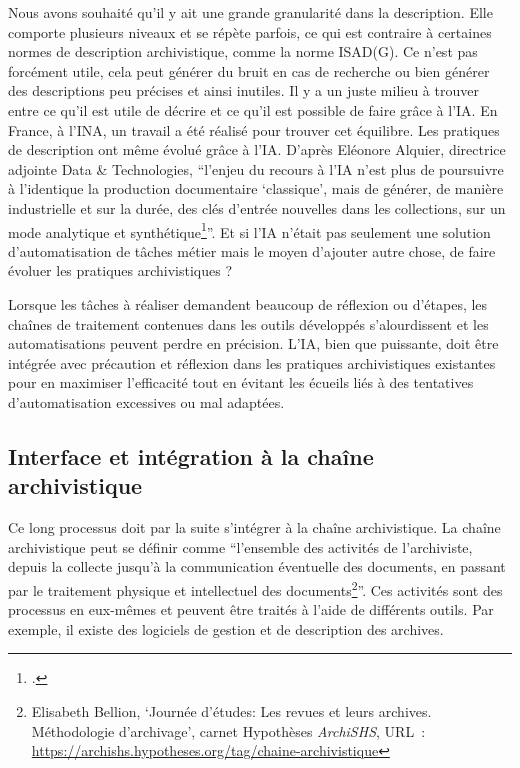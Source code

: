 Nous avons souhaité qu'il y ait une grande granularité dans la description.
Elle comporte plusieurs niveaux 
et se répète parfois, ce qui est contraire à certaines normes de description archivistique, comme la norme ISAD(G). Ce n'est pas forcément utile, 
cela peut générer du bruit en cas de recherche ou bien générer des descriptions peu précises et ainsi inutiles.
Il y a un juste milieu à trouver entre ce qu'il est utile de décrire et ce qu'il est possible de faire grâce à l'IA. 
En France, à l'INA, un travail a été réalisé pour trouver cet équilibre. Les pratiques de description ont même évolué grâce à l'IA.
D'après Eléonore Alquier, directrice adjointe Data \& Technologies, \enquote{l'enjeu du recours à l'IA n'est plus de poursuivre à l'identique la production documentaire \enquote{classique}, mais
	de générer, de manière industrielle et sur la durée, des clés d'entrée nouvelles dans les collections, sur un mode analytique
	et synthétique\footcite{IA_INA}}.
Et si l'IA n'était pas seulement une solution d'automatisation de tâches métier mais le moyen d'ajouter autre chose, de faire évoluer les pratiques archivistiques ?

 Lorsque les tâches à réaliser demandent beaucoup de réflexion ou d'étapes, les chaînes de traitement contenues dans les outils développés s'alourdissent et
les automatisations peuvent perdre en précision.
L'IA, bien que puissante, doit être intégrée avec précaution et réflexion dans les pratiques archivistiques existantes 
 pour en maximiser l'efficacité tout en évitant les écueils liés à des tentatives d'automatisation excessives ou mal adaptées. 


\subsection{Interface et intégration à la chaîne archivistique}

Ce long processus doit par la suite s'intégrer à la chaîne archivistique. La chaîne archivistique peut se définir comme
\enquote{l’ensemble des activités de l’archiviste, depuis la collecte jusqu’à la communication éventuelle des documents, en passant par le traitement physique et intellectuel des documents\footnote{Elisabeth Bellion, \enquote{Journée d’études: Les revues et leurs archives. Méthodologie d’archivage}, carnet Hypothèses \emph{ArchiSHS}, \textsc{URL}~: \url{https://archishs.hypotheses.org/tag/chaine-archivistique}}}. 
Ces activités sont des processus en eux-mêmes et peuvent être traités à l'aide de différents outils. 
Par exemple, il existe des logiciels de gestion et de description des archives. 

